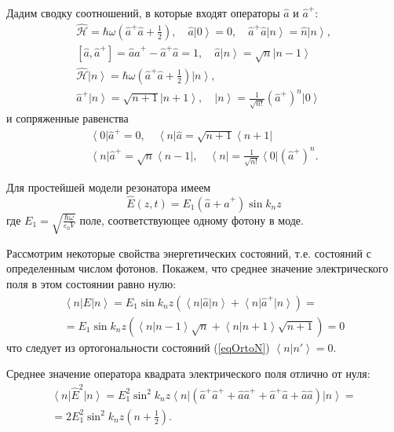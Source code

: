 Дадим сводку соотношений, в которые входят операторы $\hat{a}$ и $\hat{a}^{+}$:
\begin{eqnarray}
\hat{\mathcal{H}} = \hbar \omega \left(\hat{a}^{+}\hat{a} +
\frac{1}{2} \right),
\quad
\hat{a}\left|0\right> = 0,
\quad
\hat{a}^{+}\hat{a}\left|n\right> = \hat{n}\left|n\right>,
\nonumber \\
\left[\hat{a}, \hat{a}^{+}\right] = \hat{a} \hat{a}^{+} - \hat{a}^{+}
\hat{a} = 1,
\quad
\hat{a}\left|n\right> = \sqrt{n}\left|n - 1\right>
\nonumber \\
\hat{\mathcal{H}}\left|n\right> = \hbar \omega \left(\hat{a}^{+}\hat{a} +
\frac{1}{2} \right)\left|n\right>,
\nonumber \\
\hat{a}^{+}\left|n\right> = \sqrt{n + 1}\left|n + 1\right>,
\quad
\left|n\right> = \frac{1}{\sqrt{n!}}\left(\hat{a}^{+}\right)^n\left|0\right>
\end{eqnarray}
и сопряженные равенства
\begin{eqnarray}
\left<0\right|\hat{a}^{+} = 0,
\quad
\left<n\right|\hat{a} = \sqrt{n + 1}\left<n + 1\right|
\nonumber \\
\left<n\right|\hat{a}^{+} = \sqrt{n}\left<n - 1\right|,
\quad
\left<n\right| =  \frac{1}{\sqrt{n!}} \left<0\right|\left(\hat{a}^{+}\right)^n.
\end{eqnarray}

Для простейшей модели резонатора имеем
\[
\hat{E}\left(z, t\right) = E_1\left( \hat{a} +
\hat{a}^{+}\right) \sin k_n z
\]
где $E_1 = \sqrt{\frac{\hbar \omega}{\varepsilon_0 V}}$  поле,
соответствующее одному фотону в моде.  

Рассмотрим некоторые свойства энергетических состояний, т.е. состояний
с определенным числом фотонов. Покажем, что среднее значение
электрического поля в этом состоянии равно нулю: 
\begin{eqnarray}
\left<n\right|\hat{E}\left|n\right> = 
E_1 \sin k_n z \left( \left<n\right|\hat{a}\left|n\right> +
\left<n\right|\hat{a}^{+}\left|n\right>\right) =
\nonumber \\
= E_1 \sin k_n z \left( \left<n\right|\left.n - 1\right> \sqrt{n} +
\left<n\right|\left.n + 1\right> \sqrt{n + 1}
\right) = 0
\label{eqCh1_E_middle}
\end{eqnarray}
что следует из ортогональности состояний (\ref{eqOrtoN})
$\left<n\right|\left.n'\right> = 0$.

Среднее значение оператора квадрата электрического поля отлично от нуля:
\begin{eqnarray}
\left<n\right|\hat{E}^2\left|n\right> = 
E_1^2 \sin^2 k_n z \left<n\right|
\left(
\hat{a}^{+} \hat{a}^{+} + \hat{a} \hat{a}^{+} + \hat{a}^{+} \hat{a} +
\hat{a} \hat{a}
\right)
\left|n\right> =
\nonumber \\
= 2 E_1^2 \sin^2 k_n z \left( n + \frac{1}{2}
\right).
\label{eqCh1_E2_middle}
\end{eqnarray}

